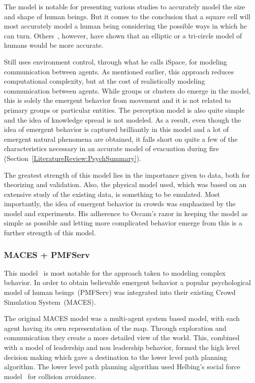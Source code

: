 The model is notable for presenting various studies to accurately model the size and shape of human beings. But it comes to the conclusion that a square cell will most accurately model a human being considering the possible ways in which he can turn. Others~\cite{Thompson:1995tm,Langston:2006kw}, however, have shown that an elliptic or a tri-circle model of humans would be more accurate.

Still uses environment control, through what he calls iSpace, for modeling communication between agents. As mentioned earlier, this approach reduces computational complexity, but at the cost of realistically modeling communication between agents. While groups or clusters do emerge in the model, this is solely the emergent behavior from movement and it is not related to primary groups or particular entities. The perception model is also quite simple and the idea of knowledge spread is not modeled. As a result, even though the idea of emergent behavior is captured brilliantly in this model and a lot of emergent natural phenomena are obtained, it falls short on quite a few of the characteristics necessary in an accurate model of evacuation during fire (Section~\ref{LiteratureReview:PsychSummary}).

The greatest strength of this model lies in the importance given to data, both for theorizing and validation. Also, the physical model used, which was based on an extensive study of the existing data, is something to be emulated. Most importantly, the idea of emergent behavior in crowds was emphasized by the model and experiments. His adherence to Occam's razor in keeping the model as simple as possible and letting more complicated behavior emerge from this is a further strength of this model.


\subsubsection{MACES + PMFServ}
\label{MACESPMFServ}

This model~\cite{Pelechano:2005vp} is most notable for the approach taken to modeling complex behavior. In order to obtain believable emergent behavior a popular psychological model of human beings~(PMFServ) was integrated into their existing Crowd Simulation System~(MACES).

The original MACES model was a multi-agent system based model, with each agent having its own representation of the map. Through exploration and communication they create a more detailed view of the world. This, combined with a model of leadership and non leadership behavior, formed the high level decision making which gave a destination to the lower level path planning algorithm. The lower level path planning algorithm used Helbing's social force model~\cite{Helbing:1995ie} for collision avoidance.

